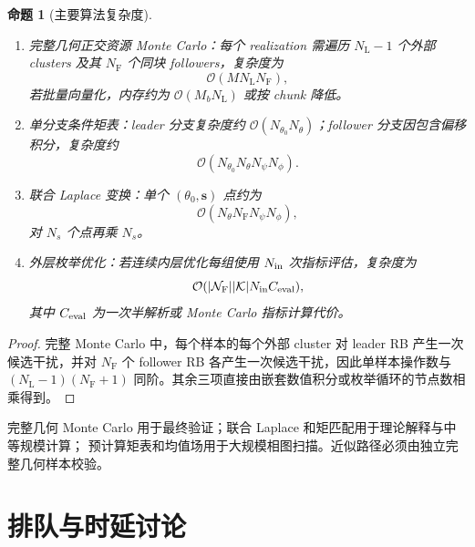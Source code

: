 \documentclass[UTF8,a4paper,11pt]{ctexart}
\newtheorem{proposition}{命题}[section]
\newcommand{\NL}{N_{\mathrm L}}
\newcommand{\NF}{N_{\mathrm F}}
\newcommand{\svec}{\bm s}
\begin{document}
\begin{proposition}[主要算法复杂度]
\begin{enumerate}[leftmargin=2em]
  \item 完整几何正交资源 Monte Carlo：每个 realization 需遍历 $\NL-1$ 个外部 clusters
  及其 $\NF$ 个同块 followers，复杂度为
  \begin{equation}
   \mathcal O(M\NL\NF),
   \label{eq:mc-complexity}
  \end{equation}
  若批量向量化，内存约为 $\mathcal O(M_b\NL)$ 或按 chunk 降低。
  \item 单分支条件矩表：leader 分支复杂度约
  $\mathcal O(N_{\theta_0}N_\theta)$；follower 分支因包含偏移积分，复杂度约
  \begin{equation}
   \mathcal O(N_{\theta_0}N_\theta N_\psi N_\phi).
   \label{eq:moment-complexity}
  \end{equation}
  \item 联合 Laplace 变换：单个 $(\theta_0,\svec)$ 点约为
  \begin{equation}
   \mathcal O(N_\theta\NF N_\psi N_\phi),
   \label{eq:joint-lt-complexity}
  \end{equation}
  对 $N_s$ 个点再乘 $N_s$。
  \item 外层枚举优化：若连续内层优化每组使用 $N_{\rm in}$ 次指标评估，复杂度为
  \begin{equation}
   \mathcal O(
   |\mathcal N_{\rm F}||\mathcal K|N_{\rm in}C_{\rm eval}),
   \label{eq:optimization-complexity}
  \end{equation}
  其中 $C_{\rm eval}$ 为一次半解析或 Monte Carlo 指标计算代价。
\end{enumerate}
\end{proposition}

\begin{proof}
完整 Monte Carlo 中，每个样本的每个外部 cluster 对 leader RB 产生一次候选干扰，并对
$\NF$ 个 follower RB 各产生一次候选干扰，因此单样本操作数与
$(\NL-1)(\NF+1)$ 同阶。其余三项直接由嵌套数值积分或枚举循环的节点数相乘得到。
\end{proof}

完整几何 Monte Carlo 用于最终验证；联合 Laplace 和矩匹配用于理论解释与中等规模计算；
预计算矩表和均值场用于大规模相图扫描。近似路径必须由独立完整几何样本校验。

\section{排队与时延讨论}
\end{document}
